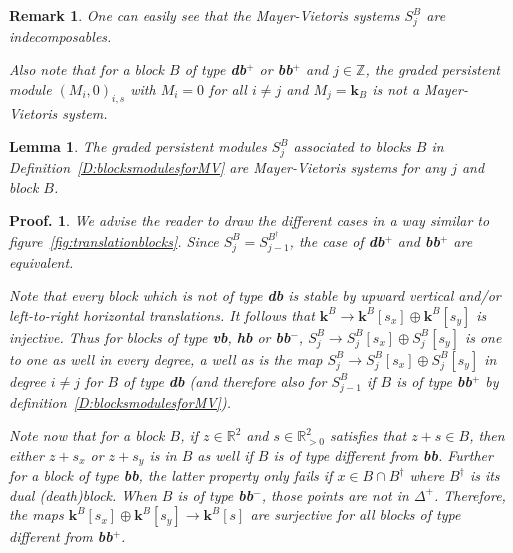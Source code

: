 \documentclass[a4paper, english, 11pt]{article}
\newcommand{\kk}[0]{\textbf{k}}
\newcommand{\0}{\vec{0}}
\newcommand{\R}[0]{\mathbb{R}}
\newcommand{\Z}[0]{\mathbb{Z}}
\newtheorem*{pf}{Proof.} }
\newtheorem{remark}[prop]{Remark}
\newtheorem{lem}[prop]{Lemma}
\begin{document}
\begin{remark}
One can easily see that the Mayer-Vietoris systems $S_j^B$ are indecomposables.

Also note that for a block $B$ of type \textbf{db}$^+$ or \textbf{bb}$^{+}$ and $j\in \Z$, the graded persistent module $(M_i,0)_{i,s}$ with $M_i = 0$ for all $i\not = j$ and $M_j = \kk_B$ is \emph{not} a Mayer-Vietoris system.
\end{remark}
\begin{lem} The graded persistent modules $S_j^{B}$ associated to blocks $B$ in Definition~\ref{D:blocksmodulesforMV} are Mayer-Vietoris systems for any $j$ and block $B$.
\end{lem}
\begin{pf} We advise the reader to draw the different cases in a way similar to figure~\ref{fig:translationblocks}. Since $S_j^B =S_{j-1}^{B^\dagger}$, the case of \textbf{db}$^+$ and \textbf{bb}$^+$ are equivalent.

\smallskip 

 Note that every block which is not of type  \textbf{db} is stable by upward vertical and/or left-to-right  horizontal translations. It follows that $\kk^B \to \kk^B[s_x] \oplus \kk^B[s_y]$ is injective. Thus for blocks of type \textbf{vb}, \textbf{hb} or \textbf{bb}$^{-}$,  $S^B_j \to S^B_j[s_x]\oplus S^B_j [s_y]$ is one to one as well in every degree, a well as is the map $S^B_j \to S^B_j[s_x]\oplus S^B_j [s_y]$ in degree $i\neq j$ for $B$ of type \textbf{db} (and therefore also for $S^B_{j-1}$ if $B$ is of type \textbf{bb}$^{+}$ by definition~\ref{D:blocksmodulesforMV}). 

 \smallskip
 
 Note now that for a block $B$, if $z \in \R^2$ and $s\in \R^2_{>0}$ satisfies that $z+s \in B$, then either  $z+s_x$ or $z+s_y$ is in $B$ as well if $B$ is of type different from \textbf{bb}. Further for a block of type \textbf{bb}, the latter property only fails if $x \in B\cap B^\dagger$ where $B^\dagger$ is its dual (death)block. When $B$ is of type \textbf{bb}$^{-}$, those points are not in $\Delta^+$.   
 Therefore, the maps $\kk^B[s_x]\oplus \kk^B[s_y]\to \kk^B[s]$ are surjective for all blocks of type different from \textbf{bb}$^{+}$. 
 
 \smallskip 
 

\end{pf}
\end{document}

